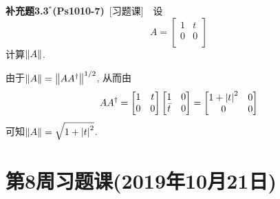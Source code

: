 	\textbf{补充题3.3$ ^* $(Ps1010-7)}\ [习题课]\ \ 设
	\[
	A=\begin{bmatrix}1 & t\\0 & 0\\\end{bmatrix} 
	\]
	计算$ \left\| A \right\| $.
	\begin{Solution}
	由于$ \left\| A \right\|=\left\| AA^\dagger \right\|^{1/2} $, 从而由
	\[
	AA^\dagger=\begin{bmatrix}1&t\\0&0\\\end{bmatrix}
	\begin{bmatrix}1&0\\\bar{t}&0\\\end{bmatrix}=\begin{bmatrix}
	1+\left| t \right| ^2&0\\0&0\\
	\end{bmatrix}
	\]
	可知$ \left\| A \right\|=\sqrt{1+\left| t \right| ^2} $.
	\end{Solution}
	
	\section{第8周习题课(2019年10月21日)}

